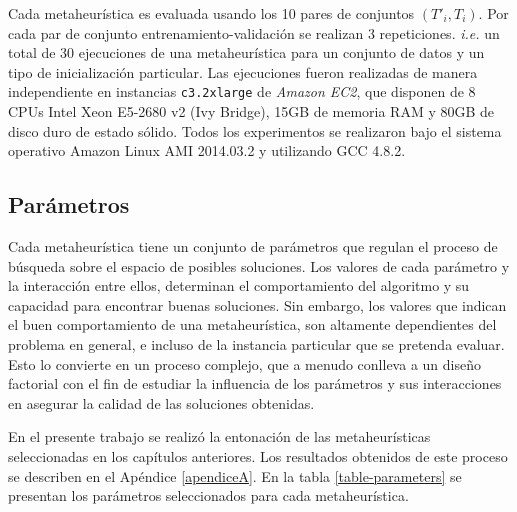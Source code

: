 Cada metaheurística es evaluada usando los 10 pares de conjuntos $(T'_i, T_i)$. Por cada par de conjunto entrenamiento-validación se realizan 3 repeticiones. \emph{i.e.} un total de 30 ejecuciones de una metaheurística para un conjunto de datos y un tipo de inicialización particular. Las ejecuciones fueron realizadas de manera independiente en instancias \texttt{c3.2xlarge} de \emph{Amazon EC2}, que disponen de 8 CPUs Intel Xeon E5-2680 v2 (Ivy Bridge), 15GB de memoria RAM y 80GB de disco duro de estado sólido. Todos los experimentos se realizaron bajo el sistema operativo Amazon Linux AMI 2014.03.2 y utilizando GCC 4.8.2.

\subsection{Parámetros}

Cada metaheurística tiene un conjunto de parámetros que regulan el proceso de búsqueda sobre el espacio de posibles soluciones. Los valores de cada parámetro y la interacción entre ellos, determinan el comportamiento del algoritmo y su capacidad para encontrar buenas soluciones. Sin embargo, los valores que indican el buen comportamiento de una metaheurística, son altamente dependientes del problema en general, e incluso de la instancia particular que se pretenda evaluar. Esto lo convierte en un proceso complejo, que a menudo conlleva a un diseño factorial con el fin de estudiar la influencia de los parámetros y sus interacciones en asegurar la calidad de las soluciones obtenidas.

En el presente trabajo se realizó la entonación de las metaheurísticas seleccionadas en los capítulos anteriores. Los resultados obtenidos de este proceso se describen en el Apéndice \ref{apendiceA}. En la tabla \ref{table-parameters} se presentan los parámetros seleccionados para cada metaheurística.

